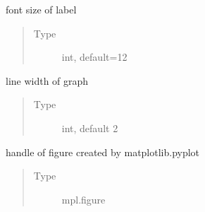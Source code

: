 \documentclass[letterpaper,10pt,english,openany,oneside]{sphinxmanual}
\begin{document}
\begin{fulllineitems}
\begin{fulllineitems}
\begin{quote}
\begin{description}
\end{description}\end{quote}

\end{fulllineitems}


\begin{fulllineitems}
font size of label
\begin{quote}\begin{description}
\item[{Type}] \leavevmode
int, default=12

\end{description}\end{quote}

\end{fulllineitems}


\begin{fulllineitems}
\label{\detokenize{pygpc:pygpc.vis.Visualization.Visualisation.graph_lind_width}}
line width of graph
\begin{quote}\begin{description}
\item[{Type}] \leavevmode
int, default 2

\end{description}\end{quote}

\end{fulllineitems}


\begin{fulllineitems}
\label{\detokenize{pygpc:pygpc.vis.Visualization.fig}}
handle of figure created by matplotlib.pyplot
\begin{quote}\begin{description}
\item[{Type}] \leavevmode
mpl.figure

\end{description}\end{quote}


\end{fulllineitems}
\end{fulllineitems}
\end{document}
